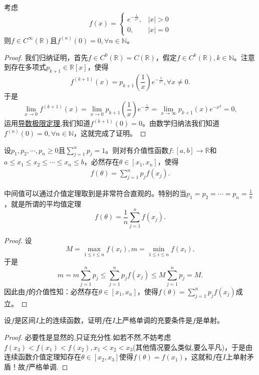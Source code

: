 \documentclass[../../main.tex]{subfiles}
\begin{document}
\begin{example}[\,\,经典光滑函数]\label{example:经典光滑函数}
考虑
\[
f(x)=
\begin{cases}
e^{-\frac{1}{x^2}}, &|x|>0 \\
0, &|x| = 0
\end{cases}
\]
则\(f\in C^{\infty}(\mathbb{R})\)且\(f^{(n)}(0)=0,\forall n\in\mathbb{N}\)。
\end{example}
\begin{proof}
我们归纳证明，首先\(f\in C^{0}(\mathbb{R}) = C(\mathbb{R})\)，假定\(f\in C^{k}(\mathbb{R}),k\in\mathbb{N}\)。注意到存在多项式\(p_{k + 1}\in\mathbb{R}[x]\)，使得
\[
f^{(k + 1)}(x)=p_{k + 1}\left(\frac{1}{x}\right)e^{-\frac{1}{x^2}},\forall x\neq0.
\]
于是
\[
\lim_{x\rightarrow0}f^{(k + 1)}(x)=\lim_{x\rightarrow0}p_{k + 1}\left(\frac{1}{x}\right)e^{-\frac{1}{x^2}}=\lim_{x\rightarrow\infty}p_{k + 1}(x)e^{-x^2}=0,
\]
运用\hyperref[theorem:导数极限定理]{导数极限定理},我们知道\(f^{(k + 1)}(0)=0\)。由数学归纳法我们知道\(f^{(n)}(0)=0,\forall n\in\mathbb{N}\)，这就完成了证明。
\end{proof}

\begin{theorem}[连续函数中间值定理]\label{theorem:连续函数中间值定理}
设\(p_1,p_2,\cdots,p_n\geqslant0\)且\(\sum_{j = 1}^{n}p_j = 1\)。则对有介值性函数\(f:[a,b]\to\mathbb{R}\)和\(a\leqslant x_1\leqslant x_2\leqslant\cdots\leqslant x_n\leqslant b\)，必然存在\(\theta\in[x_1,x_n]\)，使得
\begin{align*}
f(\theta)=\sum_{j = 1}^{n}p_jf(x_j).
\end{align*}
\end{theorem}
\begin{note}
中间值可以通过介值定理取到是非常符合直观的。特别的当\(p_1 = p_2=\cdots=p_n=\frac{1}{n}\)，就是所谓的平均值定理
\[
f(\theta)=\frac{1}{n}\sum_{j = 1}^{n}f(x_j).
\]
\end{note}
\begin{proof}
设
\[
M=\max_{1\leqslant i\leqslant n}f(x_i),m=\min_{1\leqslant i\leqslant n}f(x_i).
\]
于是
\[
m = m\sum_{j = 1}^{n}p_j\leqslant\sum_{j = 1}^{n}p_jf(x_j)\leqslant M\sum_{j = 1}^{n}p_j = M.
\]
因此由\(f\)的介值性知：必然存在\(\theta\in[x_1,x_n]\)，使得$f(\theta)=\sum_{j = 1}^{n}p_jf(x_j)$成立。
\end{proof}

\begin{proposition}[连续单射等价严格单调]\label{proposition:连续单射等价严格单调}
设\(f\)是区间\(I\)上的连续函数，证明\(f\)在\(I\)上严格单调的充要条件是\(f\)是单射。
\end{proposition}
\begin{proof}
必要性是显然的,只证充分性.如若不然,不妨考虑\(f(x_3)<f(x_1)<f(x_2),x_1<x_2<x_3\)(其他情况要么类似,要么平凡)，于是由连续函数介值定理知存在\(\theta\in[x_2,x_3]\)使得\(f(\theta)=f(x_1)\)，这就和\(f\)在\(I\)上单射矛盾！故\(f\)严格单调.
\end{proof}
\end{document}
